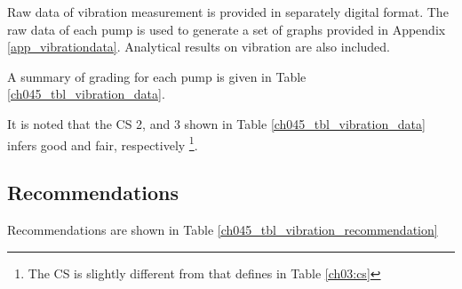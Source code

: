 Raw data of vibration measurement is provided in separately digital format. The raw data of each pump is used to generate a set of graphs provided in Appendix \ref{app_vibrationdata}. Analytical results on vibration are also included.

A summary of grading for each pump is given in Table \ref{ch045_tbl_vibration_data}.




It is noted that the CS 2, and 3 shown in Table \ref{ch045_tbl_vibration_data} infers good and fair, respectively \footnote{The CS is slightly different from that defines in Table \ref{ch03:cs}}. 

%

\subsection{Recommendations}


Recommendations are shown in Table \ref{ch045_tbl_vibration_recommendation}





%


%
